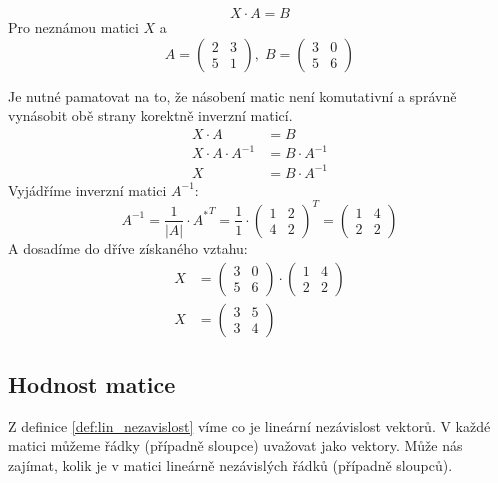 \begin{example}
    $$X\cdot A = B$$
    Pro neznámou matici $X$ a
    \[
    A = \begin{pmatrix}
        2 & 3 \\
        5 & 1
    \end{pmatrix}, \;
    B = \begin{pmatrix}
        3 & 0 \\
        5 & 6
    \end{pmatrix}
    \]

Je nutné pamatovat na to, že násobení matic není komutativní a správně vynásobit obě
strany korektně inverzní maticí.
    \begin{align*}
        X \cdot A &= B \\
        X \cdot A \cdot A^{-1} &= B \cdot A^{-1}\\
        X &= B \cdot A^{-1}
    \end{align*}
Vyjádříme inverzní matici $A^{-1}$:
\[A^{-1} =\frac{1}{|A|} \cdot {A^*}^T = \frac{1}{1} \cdot
\begin{pmatrix}
    1 & 2 \\
    4 & 2
\end{pmatrix}^T = \begin{pmatrix}
    1 & 4 \\
    2 & 2
\end{pmatrix}
\]
A dosadíme do dříve získaného vztahu:
    \begin{align*}
        X &=
        \begin{pmatrix}
            3 & 0 \\
            5 & 6
        \end{pmatrix} \cdot
        \begin{pmatrix}
            1 & 4 \\
            2 & 2
        \end{pmatrix} \\
        X &=
        \begin{pmatrix}
        3 & 5 \\
        3 & 4
        \end{pmatrix}
    \end{align*}
\end{example}

\subsection{Hodnost matice}
Z definice \ref{def:lin_nezavislost} víme co je lineární nezávislost vektorů. V každé
matici můžeme řádky (případně sloupce) uvažovat jako vektory. Může nás zajímat, kolik je v
matici lineárně nezávislých řádků (případně sloupců).

